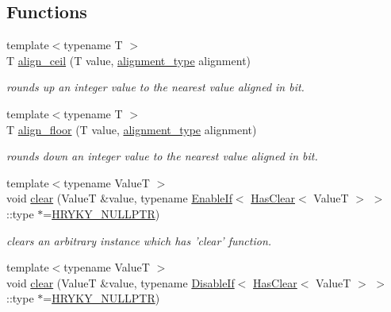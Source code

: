\subsection*{Functions}
\begin{DoxyCompactItemize}
\item 
{\footnotesize template$<$typename T $>$ }\\T \hyperlink{namespacehryky_a7ddd0f39f2f0953fe7e3cbaedaf98644}{align\-\_\-ceil} (T value, \hyperlink{namespacehryky_aee1af251193c2d308aaa68ef7e36a540}{alignment\-\_\-type} alignment)
\begin{DoxyCompactList}\small\item\em rounds up an integer value to the nearest value aligned in bit. \end{DoxyCompactList}\item 
{\footnotesize template$<$typename T $>$ }\\T \hyperlink{namespacehryky_a84803d86a3bb217481dd0a180734fb8f}{align\-\_\-floor} (T value, \hyperlink{namespacehryky_aee1af251193c2d308aaa68ef7e36a540}{alignment\-\_\-type} alignment)
\begin{DoxyCompactList}\small\item\em rounds down an integer value to the nearest value aligned in bit. \end{DoxyCompactList}\item 
\hypertarget{namespacehryky_aa201297ea9530da954a7230be71cc19d}{{\footnotesize template$<$typename Value\-T $>$ }\\void \hyperlink{namespacehryky_aa201297ea9530da954a7230be71cc19d}{clear} (Value\-T \&value, typename \hyperlink{classhryky_1_1_enable_if}{Enable\-If}$<$ \hyperlink{classhryky_1_1_has_clear}{Has\-Clear}$<$ Value\-T $>$ $>$\-::type $\ast$=\hyperlink{common_8h_a4cd4ac09cfcdbd6b30ee69afc156e210}{H\-R\-Y\-K\-Y\-\_\-\-N\-U\-L\-L\-P\-T\-R})}\label{namespacehryky_aa201297ea9530da954a7230be71cc19d}

\begin{DoxyCompactList}\small\item\em clears an arbitrary instance which has 'clear' function. \end{DoxyCompactList}\item 
\hypertarget{namespacehryky_a17ff650587d39be66b7c729876944c21}{{\footnotesize template$<$typename Value\-T $>$ }\\void \hyperlink{namespacehryky_a17ff650587d39be66b7c729876944c21}{clear} (Value\-T \&value, typename \hyperlink{classhryky_1_1_disable_if}{Disable\-If}$<$ \hyperlink{classhryky_1_1_has_clear}{Has\-Clear}$<$ Value\-T $>$ $>$\-::type $\ast$=\hyperlink{common_8h_a4cd4ac09cfcdbd6b30ee69afc156e210}{H\-R\-Y\-K\-Y\-\_\-\-N\-U\-L\-L\-P\-T\-R})}\label{namespacehryky_a17ff650587d39be66b7c729876944c21}


\end{DoxyCompactItemize}
